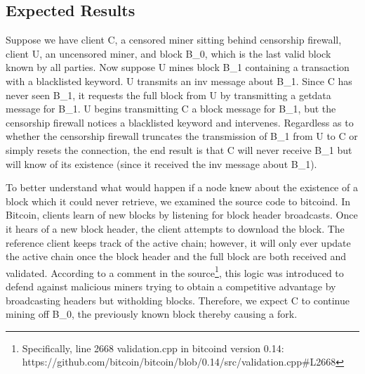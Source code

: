 \usetikzlibrary{arrows.meta}

\subsection{Expected Results}
Suppose we have client C, a censored miner sitting behind censorship firewall,  client U, an uncensored miner, and block B_0, which is the last valid block known by all parties. Now suppose U mines block B_1 containing a transaction with a blacklisted keyword. U transmits an inv message about B_1. Since C has never seen B_1, it requests the full block from U by transmitting a getdata message for B_1. U begins transmitting C a block message for B_1, but the censorship firewall notices a blacklisted keyword and intervenes.
Regardless as to whether the censorship firewall truncates the transmission of B_1 from U to C or simply resets the connection, the end result is that C will never receive B_1 but will know of its existence (since it received the inv message about B_1).

To better understand what would happen if a node knew about the existence of a block which it could never retrieve, we examined the source code to bitcoind. In Bitcoin, clients learn of new blocks by listening for block header broadcasts. Once it hears of a new block header, the client attempts to download the block. The reference client keeps track of the active chain; however, it will only ever update the active chain once the block header and the full block are both received and validated. According to a comment in the source\footnote{Specifically, line 2668 validation.cpp in bitcoind version 0.14: https://github.com/bitcoin/bitcoin/blob/0.14/src/validation.cpp#L2668}, this logic was introduced to defend against malicious miners trying to obtain a competitive advantage by broadcasting headers but witholding blocks. Therefore, we expect C to continue mining off B_0, the previously known block thereby causing a fork.

